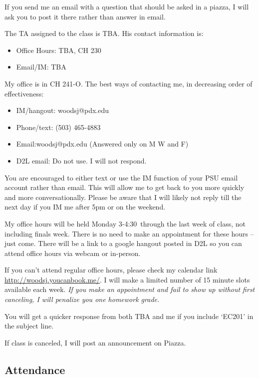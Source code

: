 \documentclass[letterpaper,10pt]{article}
\newcommand{\Office}{Monday 3-4:30}
\begin{document}
If you send me an email with a question that should be asked in a piazza, I
will ask you to post it there rather than answer in email.

The TA assigned to the class is TBA. 
 His contact information is:
 \begin{itemize}
 \item Office Hours: TBA, CH 230

 \item Email/IM: TBA

 \end{itemize}


My office is in CH 241-O.  The best ways of contacting me, in
decreasing order of effectiveness:
\begin{itemize}

\item IM/hangout: woodsj@pdx.edu

\item Phone/text: (503) 465-4883
\item Email:woodsj@pdx.edu (Answered only on M W and F)
\item D2L email: Do not use.  I will not respond.
\end{itemize}

You are encouraged to either text or use the IM function of your PSU email account rather than email. This will allow me to get back to you more quickly and more conversationally. Please be aware that I will likely not reply till the next day if you IM me after 5pm or on the weekend.  

My office hours will be held \Office ~through the last week of class, not including finals week. There is no need to make an appointment for these hours -- just come.  There will be a link to a google hangout posted in D2L so you can attend office hours via webcam or in-person.

If you can't attend regular office hours, please check my calendar link \url{http://woodsj.youcanbook.me/}. I will make a limited number of 15 minute slots available each week.  \emph{If you make an appointment and fail to show up without first canceling, I will penalize you one homework grade.}  


You will get a quicker response from both TBA and me if you include `EC201' in the subject line.


If class is canceled, I will post an announcement on Piazza.

\subsection{Attendance}
\end{document}
